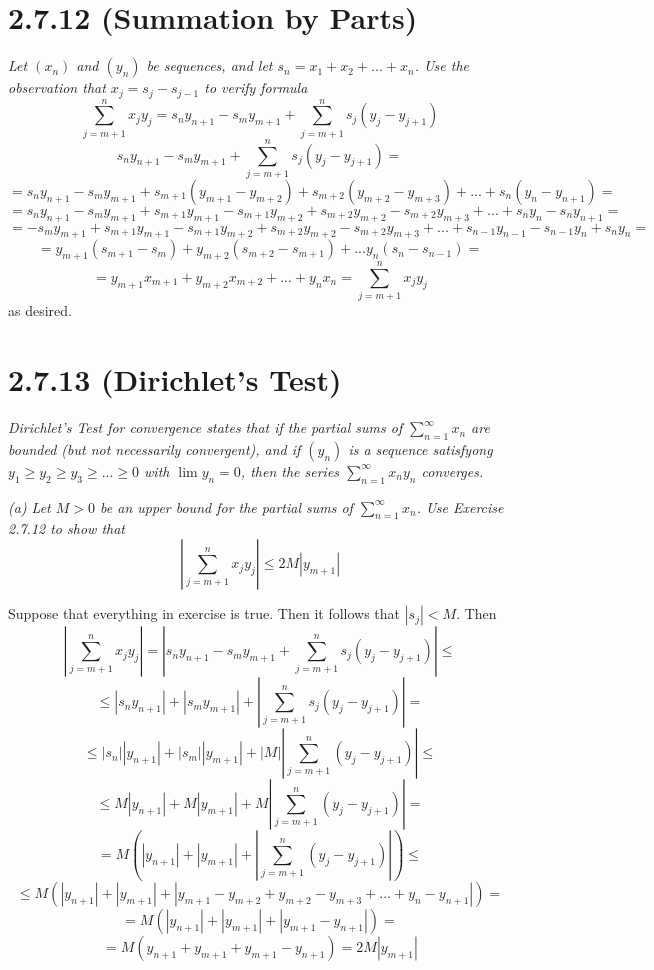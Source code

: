 \documentclass[11pt,oneside,titlepage]{article}
\begin{document}
\section*{2.7.12 (Summation by Parts)}
\textit{Let $(x_n)$ and $(y_n)$ be sequences, and let
  $s_n = x_1 + x_2 + ... + x_n$. Use the observation that
  $x_j = s_j - s_{j - 1}$ to verify formula }
$$\sum_{j = m + 1}^{n} x_j y_j = s_n y_{n + 1} - s_m y_{m + 1} +
\sum_{j = m + 1}^{n} s_j (y_j - y_{j + 1})$$
$$s_n y_{n + 1} - s_m y_{m + 1} +
\sum_{j = m + 1}^{n} s_j (y_j - y_{j + 1}) = $$
$$ = s_n y_{n + 1} - s_m y_{m + 1} +
s_{m + 1} (y_{m + 1} - y_{m + 2}) +
s_{m + 2} (y_{m + 2} - y_{m + 3}) +
... +
s_{n} (y_{n} - y_{n + 1}) = $$
$$ = s_n y_{n + 1} - s_m y_{m + 1} +
s_{m + 1} y_{m + 1} - s_{m + 1} y_{m + 2} +
s_{m + 2} y_{m + 2} - s_{m + 2} y_{m + 3} +
... +
s_{n} y_{n} - s_{n} y_{n + 1} = $$
$$ =  - s_m y_{m + 1} +
s_{m + 1} y_{m + 1} - s_{m + 1} y_{m + 2} +
s_{m + 2} y_{m + 2} - s_{m + 2} y_{m + 3} +
... + s_{n - 1} y_{n - 1} - s_{n - 1} y_{n}
+ s_{n} y_{n}  = $$
$$ =  y_{m + 1}(s_{m + 1} - s_m ) +
y_{m + 2}(s_{m + 2} - s_{m + 1} ) +
...   y_{n}( s_{n} - s_{n - 1})  = $$
$$ = y_{m + 1} x_{m + 1} +
y_{m + 2} x_{m + 2} + ... +
y_{n}x_n = \sum_{j = m + 1}^{n} x_j y_j
$$
as desired.

\section*{2.7.13 (Dirichlet's Test)}
\textit{Dirichlet's Test for convergence states that if the partial sums of
  $\sum_{n = 1}^{\infty} x_n$ are bounded (but not necessarily convergent), and
  if $(y_n)$ is a sequence satisfyong $y_1 \geq y_2 \geq y_3 \geq ... \geq 0 $
  with $\lim y_n = 0$, then the series $\sum_{n=1}^{\infty} x_n y_n$ converges.
}

\textit{(a) Let $M > 0$ be an upper bound for the partial sums of
  $\sum_{n = 1}^{\infty} x_n$. Use Exercise 2.7.12 to show that }
$$\left|\sum_{j = m + 1}^{n} x_j y_j\right| \leq 2M|y_{m + 1}|$$

Suppose that everything in exercise is true. Then it follows that
$|s_j| < M$. Then
$$\left|\sum_{j = m + 1}^{n} x_j y_j\right| =
\left|s_n y_{n + 1} - s_m y_{m + 1} + \sum_{j = m + 1}^{n}{s_j (y_j - y_{j + 1})} \right| \leq$$
$$\leq \left|s_n y_{n + 1}\right| + \left|s_m y_{m + 1}\right| + \left|\sum_{j = m + 1}^{n}{s_j (y_j - y_{j + 1})} \right| = $$
$$\leq |s_n| |y_{n + 1}| + |s_m|| y_{m + 1}| + |M|\left|\sum_{j = m + 1}^{n}{ (y_j - y_{j + 1})} \right| \leq $$
$$\leq M |y_{n + 1}| + M| y_{m + 1}| + M\left|\sum_{j = m + 1}^{n}{ (y_j - y_{j + 1})} \right| =$$
$$=  M \left(|y_{n + 1}| + | y_{m + 1}| + \left|\sum_{j = m + 1}^{n}{ (y_j - y_{j + 1})} \right|\right) \leq
$$
$$\leq  M \left(|y_{n + 1}| + | y_{m + 1}| + \left| y_{m + 1} - y_{m + 2} + y_{m + 2} - y_{m + 3} +  ... + y_n - y_{n + 1}\right|\right) =$$
$$=  M \left(|y_{n + 1}| + | y_{m + 1}| + \left| y_{m + 1} - y_{n + 1}\right|\right) = $$
$$=  M \left(y_{n + 1} +  y_{m + 1} + y_{m + 1} - y_{n + 1}\right) = 2M|y_{m + 1}|$$
\end{document}
